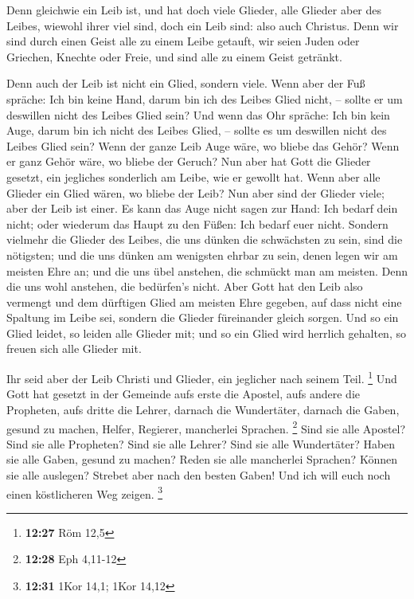  Denn gleichwie ein Leib ist, und hat doch viele Glieder,
alle Glieder aber des Leibes, wiewohl ihrer viel sind, doch ein Leib
sind: also auch Christus.  Denn wir sind durch einen
Geist alle zu einem Leibe getauft, wir seien Juden oder Griechen,
Knechte oder Freie, und sind alle zu einem Geist getränkt.

 Denn auch der Leib ist nicht ein Glied, sondern viele.
 Wenn aber der Fuß spräche: Ich bin keine Hand, darum bin
ich des Leibes Glied nicht, -- sollte er um deswillen nicht des Leibes
Glied sein?  Und wenn das Ohr spräche: Ich bin kein Auge,
darum bin ich nicht des Leibes Glied, -- sollte es um deswillen nicht
des Leibes Glied sein?  Wenn der ganze Leib Auge wäre, wo
bliebe das Gehör? Wenn er ganz Gehör wäre, wo bliebe der Geruch?
 Nun aber hat Gott die Glieder gesetzt, ein jegliches
sonderlich am Leibe, wie er gewollt hat.  Wenn aber alle
Glieder ein Glied wären, wo bliebe der Leib?  Nun aber
sind der Glieder viele; aber der Leib ist einer.  Es kann
das Auge nicht sagen zur Hand: Ich bedarf dein nicht; oder wiederum das
Haupt zu den Füßen: Ich bedarf euer nicht.  Sondern
vielmehr die Glieder des Leibes, die uns dünken die schwächsten zu sein,
sind die nötigsten;  und die uns dünken am wenigsten
ehrbar zu sein, denen legen wir am meisten Ehre an; und die uns übel
anstehen, die schmückt man am meisten.  Denn die uns wohl
anstehen, die bedürfen's nicht. Aber Gott hat den Leib also vermengt und
dem dürftigen Glied am meisten Ehre gegeben,  auf dass
nicht eine Spaltung im Leibe sei, sondern die Glieder füreinander gleich
sorgen.  Und so ein Glied leidet, so leiden alle Glieder
mit; und so ein Glied wird herrlich gehalten, so freuen sich alle
Glieder mit.

 Ihr seid aber der Leib Christi und Glieder, ein
jeglicher nach seinem Teil. \footnote{\textbf{12:27} Röm 12,5}
 Und Gott hat gesetzt in der Gemeinde aufs erste die
Apostel, aufs andere die Propheten, aufs dritte die Lehrer, darnach die
Wundertäter, darnach die Gaben, gesund zu machen, Helfer, Regierer,
mancherlei Sprachen. \footnote{\textbf{12:28} Eph 4,11-12}
 Sind sie alle Apostel? Sind sie alle Propheten? Sind sie
alle Lehrer? Sind sie alle Wundertäter?  Haben sie alle
Gaben, gesund zu machen? Reden sie alle mancherlei Sprachen? Können sie
alle auslegen?  Strebet aber nach den besten Gaben! Und
ich will euch noch einen köstlicheren Weg zeigen. \footnote{\textbf{12:31}
  1Kor 14,1; 1Kor 14,12}

